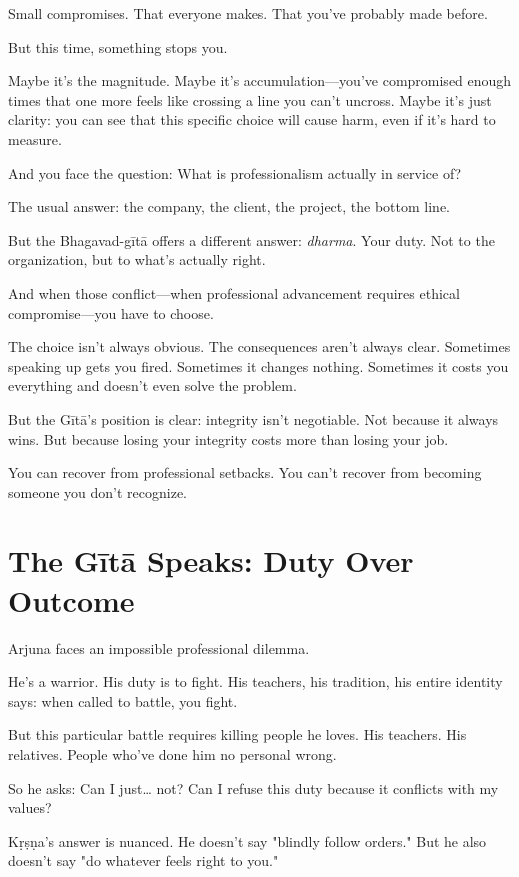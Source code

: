 \documentclass[11pt,twoside]{book}
\begin{document}
Small compromises. That everyone makes. That you've probably made before.

But this time, something stops you.

Maybe it's the magnitude. Maybe it's accumulation—you've compromised enough times that one more feels like crossing a line you can't uncross. Maybe it's just clarity: you can see that this specific choice will cause harm, even if it's hard to measure.

And you face the question: What is professionalism actually in service of?

The usual answer: the company, the client, the project, the bottom line.

But the Bhagavad-gītā offers a different answer: \emph{dharma}. Your duty. Not to the organization, but to what's actually right.

And when those conflict—when professional advancement requires ethical compromise—you have to choose.

The choice isn't always obvious. The consequences aren't always clear. Sometimes speaking up gets you fired. Sometimes it changes nothing. Sometimes it costs you everything and doesn't even solve the problem.

But the Gītā's position is clear: integrity isn't negotiable. Not because it always wins. But because losing your integrity costs more than losing your job.

You can recover from professional setbacks. You can't recover from becoming someone you don't recognize.

\section*{The Gītā Speaks: Duty Over Outcome}

Arjuna faces an impossible professional dilemma.

He's a warrior. His duty is to fight. His teachers, his tradition, his entire identity says: when called to battle, you fight.

But this particular battle requires killing people he loves. His teachers. His relatives. People who've done him no personal wrong.

So he asks: Can I just\ldots{} not? Can I refuse this duty because it conflicts with my values?

Kṛṣṇa's answer is nuanced. He doesn't say "blindly follow orders." But he also doesn't say "do whatever feels right to you."
\end{document}

